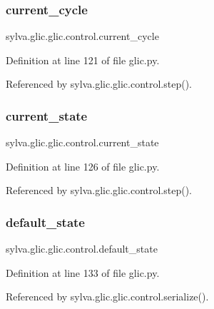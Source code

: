 \subsubsection{\texorpdfstring{current\+\_\+cycle}{current\_cycle}}
{\footnotesize\ttfamily sylva.\+glic.\+glic.\+control.\+current\+\_\+cycle}



Definition at line 121 of file glic.\+py.



Referenced by sylva.\+glic.\+glic.\+control.\+step().

\mbox{\label{classsylva_1_1glic_1_1glic_1_1control_a7f5428a930e8f920ebe651df5a899df1}} 
\subsubsection{\texorpdfstring{current\+\_\+state}{current\_state}}
{\footnotesize\ttfamily sylva.\+glic.\+glic.\+control.\+current\+\_\+state}



Definition at line 126 of file glic.\+py.



Referenced by sylva.\+glic.\+glic.\+control.\+step().

\mbox{\label{classsylva_1_1glic_1_1glic_1_1control_a2ccde55faf999d2c91c456eaac9bdee3}} 
\subsubsection{\texorpdfstring{default\+\_\+state}{default\_state}}
{\footnotesize\ttfamily sylva.\+glic.\+glic.\+control.\+default\+\_\+state}



Definition at line 133 of file glic.\+py.



Referenced by sylva.\+glic.\+glic.\+control.\+serialize().

